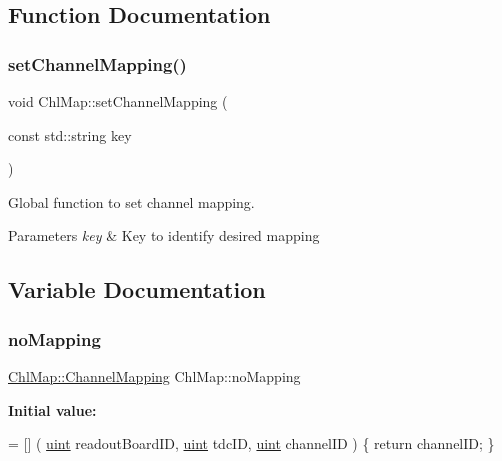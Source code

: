 \subsection{Function Documentation}
\mbox{\label{namespace_chl_map_a478e1376df593ae2963ad83ee2710ff1}} 
\subsubsection{\texorpdfstring{set\+Channel\+Mapping()}{setChannelMapping()}}
{\footnotesize\ttfamily void Chl\+Map\+::set\+Channel\+Mapping (\begin{DoxyParamCaption}\item[{const std\+::string}]{key }\end{DoxyParamCaption})}



Global function to set channel mapping. 


\begin{DoxyParams}{Parameters}
{\em key} & Key to identify desired mapping \\
\hline
\end{DoxyParams}


\subsection{Variable Documentation}
\mbox{\label{namespace_chl_map_a5912e55252670a1e71857a1374bbfa1a}} 
\subsubsection{\texorpdfstring{no\+Mapping}{noMapping}}
{\footnotesize\ttfamily \hyperlink{namespace_chl_map_a02f93d10e11f82c0ea2330212cf70545}{Chl\+Map\+::\+Channel\+Mapping} Chl\+Map\+::no\+Mapping}

{\bfseries Initial value\+:}
\begin{DoxyCode}
= [] (
    \hyperlink{_channel_mappings_8cpp_a69aa29b598b851b0640aa225a9e5d61d}{uint} readoutBoardID,
    \hyperlink{_channel_mappings_8cpp_a69aa29b598b851b0640aa225a9e5d61d}{uint} tdcID,
    \hyperlink{_channel_mappings_8cpp_a69aa29b598b851b0640aa225a9e5d61d}{uint} channelID
) \{
    \textcolor{keywordflow}{return} channelID;
\}
\end{DoxyCode}


